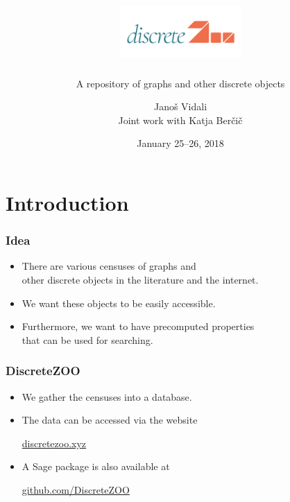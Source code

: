 \documentclass[usepdftitle=false]{beamer}
\title[DiscreteZOO]{\includegraphics[height=2cm]{discretezoo.png}}
\subtitle{A repository of graphs and other discrete objects}
\author{Janoš Vidali \\
{\scriptsize Joint work with Katja Berčič}
}
\date{January 25--26, 2018}
\newcommand{\keyw}[1]{\textcolor{zooteal}{#1}}
\newcommand{\con}[1]{\textcolor{zoored}{#1}}
\begin{document}
{
\section{Introduction}
\frame[plain]{
\titlepage
}
}

\frame
{
    \frametitle{Idea}

    \begin{itemize}
    \itemsep=5mm
    \item There are various \keyw{censuses} of graphs and \\
    other discrete objects in the literature and the internet.
    \item We want these objects to be \keyw{easily accessible}.
    \item Furthermore, we want to have \keyw{precomputed properties} \\
    that can be used for \keyw{searching}.
    \end{itemize}
}

\frame
{
    \frametitle{DiscreteZOO}

    \begin{itemize}
    \itemsep=5mm
    \item We gather the censuses into a \keyw{database}.
    \item The data can be accessed via the website
    \begin{center}
    \vskip 0.2cm
    \Large \con{\href{http://discretezoo.xyz}{discretezoo.xyz}}
    \end{center}
    \item A \keyw{Sage} package is also available at
    \begin{center}
    \vskip 0.2cm
    \Large \con{\href{https://github.com/DiscreteZOO}{github.com/DiscreteZOO}}
    \end{center}
    \end{itemize}
}
\end{document}
